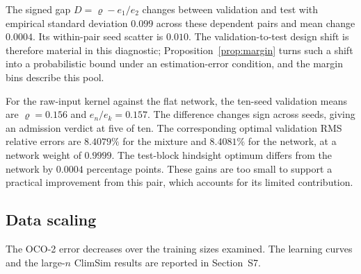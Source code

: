 The signed gap $D=\varrho-e_1/e_2$ changes between validation and test
with empirical standard deviation $0.099$ across these dependent pairs and
mean change $0.0004$. Its within-pair seed scatter is $0.010$. The
validation-to-test design shift is therefore material in this diagnostic;
Proposition~\ref{prop:margin} turns such a shift into a probabilistic bound
under an estimation-error condition, and the margin bins describe this pool.

For the raw-input kernel against the flat network, the ten-seed validation
means are $\varrho=0.156$ and $e_n/e_k=0.157$. The difference changes sign
across seeds, giving an admission verdict at five of ten. The corresponding
optimal validation RMS relative errors are $8.4079\%$ for the mixture and
$8.4081\%$ for the network, at a network weight of $0.9999$. The test-block
hindsight optimum differs from the network by $0.0004$ percentage points.
These gains are too small to support a practical improvement from this
pair, which accounts for its limited contribution.

\subsection{Data scaling}
\label{sec:oco-scaling-summary}
The OCO-2 error decreases over the training sizes examined. The learning
curves and the large-$n$ ClimSim results are reported in Section~S7.
